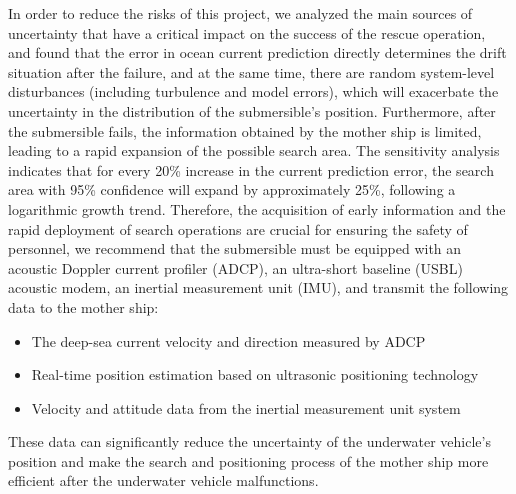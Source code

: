 \documentclass{mcmthesis}
\begin{document}
In order to reduce the risks of this project,
we analyzed the main sources of uncertainty that have a critical impact on the success of the rescue operation, and found that
the error in ocean current prediction directly determines the drift situation after the failure, and at the same time,
there are random system-level disturbances (including turbulence and model errors), which will exacerbate the uncertainty in the distribution of the submersible's position.
Furthermore, after the submersible fails, the information obtained by the mother ship is limited, leading to a rapid expansion of the possible search area.
The sensitivity analysis indicates that for every 20\% increase in the current prediction error, the search area with 95\% confidence will expand by approximately 25\%,
following a logarithmic growth trend. Therefore, the acquisition of early information and the rapid deployment of search operations are crucial for ensuring the safety of personnel,
we recommend that the submersible must be equipped with
an acoustic Doppler current profiler (ADCP),
an ultra-short baseline (USBL) acoustic modem,
an inertial measurement unit (IMU), and transmit the following data to the mother ship: \begin{itemize}
\item The deep-sea current velocity and direction measured by ADCP
\item Real-time position estimation based on ultrasonic positioning technology
\item Velocity and attitude data from the inertial measurement unit system \end{itemize}
These data can significantly reduce the uncertainty of the underwater vehicle's position and make the search and positioning process of the mother ship more efficient after the underwater vehicle malfunctions.
\end{document}
